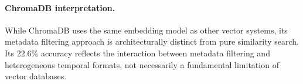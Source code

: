 \paragraph{ChromaDB interpretation.}
While ChromaDB uses the same embedding model as other vector systems, its metadata filtering approach is architecturally distinct from pure similarity search. Its 22.6\% accuracy reflects the interaction between metadata filtering and heterogeneous temporal formats, not necessarily a fundamental limitation of vector databases.
